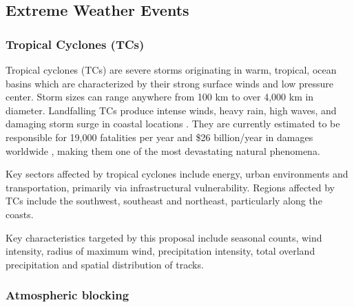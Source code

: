 \documentclass[11pt]{article}
\begin{document}


\subsection{Extreme Weather Events} \label{sec:ExtremeWeather}

\subsubsection*{Tropical Cyclones (TCs)}

Tropical cyclones (TCs) are severe storms originating in warm, tropical, ocean basins which are characterized by their strong surface winds and low pressure center. Storm sizes can range anywhere from 100 km to over 4,000 km in diameter. Landfalling TCs produce intense winds, heavy rain, high waves, and damaging storm surge in coastal locations \citep{EmanuelDivineWind}. They are currently estimated to be responsible for 19,000 fatalities per year and \$26 billion/year in damages worldwide \citep{Mendelsohn2012}, making them one of the most devastating natural phenomena.



Key sectors affected by tropical cyclones include energy, urban environments and transportation, primarily via infrastructural vulnerability.  Regions affected by TCs include the southwest, southeast and northeast, particularly along the coasts.

Key characteristics targeted by this proposal include seasonal counts, wind intensity, radius of maximum wind, precipitation intensity, total overland precipitation and spatial distribution of tracks.

\subsubsection*{Atmospheric blocking}
\end{document}
